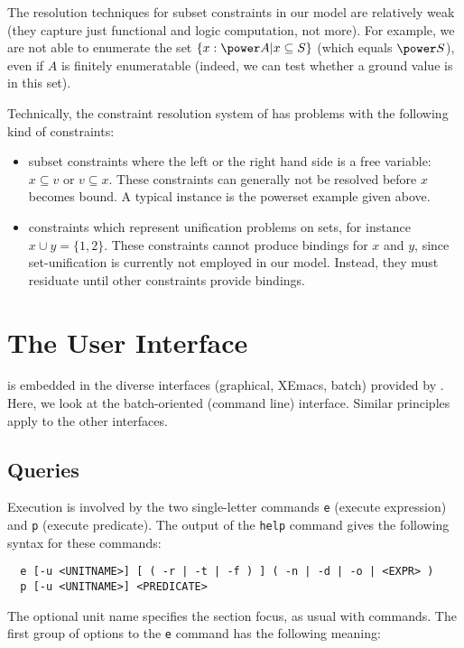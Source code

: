 \documentclass{article}
\begin{document}
The resolution techniques for subset constraints in our model
are relatively weak (they capture just functional and logic
computation, not more). For example, we are not able to enumerate the
set $\{x: \power A | x \subseteq S\}$ (which equals $\power S$), even
if $A$ is finitely enumeratable (indeed, we can test whether a ground
value is in this set).

Technically, the constraint resolution system of \ZAP{}
has problems with the following kind of constraints:

\begin{itemize}
\item subset constraints where the left or the right hand side is a
  free variable: $x \subseteq v$ or $v \subseteq x$.  These
  constraints can generally not be resolved before $x$ becomes bound.
  A typical instance is the powerset example given above.
\item constraints which represent unification problems on sets,
  for instance $x \cup y = \{1,2\}$. These
  constraints cannot produce bindings for $x$ and $y$, since set-unification
  is currently not employed in our model. Instead, they must residuate
  until other constraints provide bindings.
\end{itemize}




\section{The User Interface}

\ZAP{} is embedded in the diverse interfaces (graphical, XEmacs,
batch) provided by . Here, we look
at the batch-oriented (command line) interface. Similar principles
apply to the other interfaces.

\subsection{Queries}

Execution is involved by the two single-letter commands \verb:e:
(execute expression) and \verb:p: (execute predicate). The output
of the \verb:help: command gives the following syntax for these commands:

\begin{verbatim}
  e [-u <UNITNAME>] [ ( -r | -t | -f ) ] ( -n | -d | -o | <EXPR> ) 
  p [-u <UNITNAME>] <PREDICATE> 
\end{verbatim}

The optional unit name specifies the section focus, as usual with
\Zeta{} commands. The first group of options to the \verb:e: command
has the following meaning:
\end{document}

